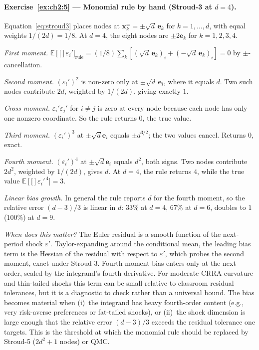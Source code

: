 \documentclass[11pt,a4paper]{report}
\newcommand{\E}[1]{\mathbb{E}\!\left[#1\right]}
\begin{document}
\paragraph{Exercise~\ref{ex:ch2:5} --- Monomial rule by hand (Stroud-3 at $d=4$).}
Equation~\eqref{eq:stroud3} places nodes at $\bm{x}_k^\pm = \pm\sqrt{d}\,\bm{e}_k$ for $k = 1, \dots, d$, with equal weights $1/(2d) = 1/8$.  At $d=4$, the eight nodes are $\pm 2 \bm{e}_k$ for $k=1,2,3,4$.

\emph{First moment.}  $\E[\varepsilon_i']_{\text{rule}} = (1/8)\sum_k [(\sqrt{d}\,\bm{e}_k)_i + (-\sqrt{d}\,\bm{e}_k)_i] = 0$ by $\pm$-cancellation.

\emph{Second moment.}  $(\varepsilon_i')^2$ is non-zero only at $\pm\sqrt{d}\,\bm{e}_i$, where it equals $d$.  Two such nodes contribute $2d$, weighted by $1/(2d)$, giving exactly $1$.

\emph{Cross moment.}  $\varepsilon_i'\varepsilon_j'$ for $i \neq j$ is zero at every node because each node has only one nonzero coordinate.  So the rule returns $0$, the true value.

\emph{Third moment.}  $(\varepsilon_i')^3$ at $\pm\sqrt{d}\bm{e}_i$ equals $\pm d^{3/2}$; the two values cancel.  Returns $0$, exact.

\emph{Fourth moment.}  $(\varepsilon_i')^4$ at $\pm\sqrt{d}\bm{e}_i$ equals $d^2$, both signs.  Two nodes contribute $2d^2$, weighted by $1/(2d)$, gives $d$.  At $d=4$, the rule returns $4$, while the true value $\E[\varepsilon_i'^{\,4}] = 3$.

\emph{Linear bias growth.}  In general the rule reports $d$ for the fourth moment, so the relative error $(d - 3)/3$ is linear in $d$: $33\%$ at $d=4$, $67\%$ at $d=6$, doubles to $1$ ($100\%$) at $d=9$.

\emph{When does this matter?}  The Euler residual is a smooth function of the next-period shock $\varepsilon'$.  Taylor-expanding around the conditional mean, the leading bias term is the Hessian of the residual with respect to $\varepsilon'$, which probes the second moment, exact under Stroud-3.  Fourth-moment bias enters only at the next order, scaled by the integrand's fourth derivative.  For moderate CRRA curvature and thin-tailed shocks this term can be small relative to classroom residual tolerances, but it is a diagnostic to check rather than a universal bound.  The bias becomes material when (i)~the integrand has heavy fourth-order content (e.g., very risk-averse preferences or fat-tailed shocks), or (ii)~the shock dimension is large enough that the relative error $(d-3)/3$ exceeds the residual tolerance one targets.  This is the threshold at which the monomial rule should be replaced by Stroud-5 ($2d^2 + 1$ nodes) or QMC.
\end{document}
